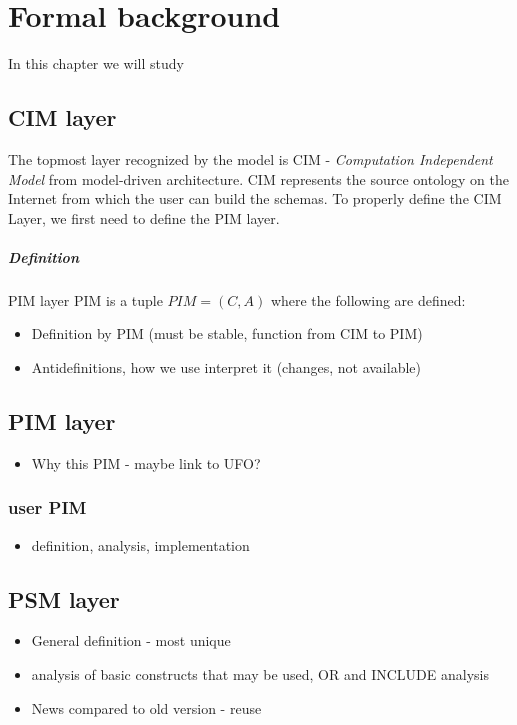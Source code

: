 \chapter{Formal background}
\label{chapters:formal-background}

In this chapter we will study

\section{CIM layer}

The topmost layer recognized by the model is CIM - \textit{Computation Independent Model} from model-driven architecture. CIM represents the source ontology on the Internet from which the user can build the schemas. To properly define the CIM Layer, we first need to define the PIM layer.

\paragraph{Definition} PIM layer $\textrm{PIM}$ is a tuple $PIM = (C, A)$ where the following are defined:


\begin{itemize}
    \item Definition by PIM (must be stable, function from CIM to PIM)
    \item Antidefinitions, how we use interpret it (changes, not available)
\end{itemize}

\section{PIM layer}

\begin{itemize}
    \item Why this PIM - maybe link to UFO?
\end{itemize}

\subsection{user PIM}

\begin{itemize}
    \item definition, analysis, implementation
\end{itemize}

\section{PSM layer}

\begin{itemize}
    \item General definition - most unique
    \item analysis of basic constructs that may be used, OR and INCLUDE analysis
    \item News compared to old version - reuse
\end{itemize}